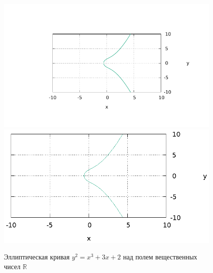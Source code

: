 \begin{figure}
\centering
\ifpdf
\includegraphics[angle=0]
{./add/discretmath/picelliptic.pdf}
\else
\includegraphics[angle=0]
{./add/discretmath/picelliptic.eps}
\fi
\caption{Эллиптическая кривая $y^2 = x^3 + 3 x + 2$ над полем
  вещественных чисел $\mathbb{R}$}
\label{fig:add:ellipticR}
\end{figure}
